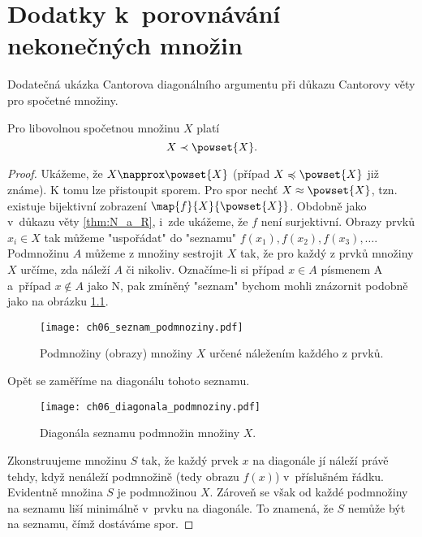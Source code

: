 \chapter{Dodatky k~porovnávání nekonečných množin}\label{chap:dodatky_k_porovnavani_nekonecnych_mn}
Dodatečná ukázka Cantorova diagonálního argumentu při důkazu Cantorovy věty pro spočetné množiny.
\begin{theorem}\label{thm:cantorova_veta_spocetne}
    Pro libovolnou spočetnou množinu $X$ platí
    \begin{equation*}
        X\prec\powset{X}.
    \end{equation*}
\end{theorem}
\begin{proof}
    Ukážeme, že $X\napprox\powset{X}$ (případ $X\preccurlyeq\powset{X}$ již známe). K tomu lze přistoupit sporem. Pro spor nechť $X\approx\powset{X}$, tzn. existuje bijektivní zobrazení $\map{f}{X}{\powset{X}}$. Obdobně jako v~důkazu věty \ref{thm:N_a_R}, i~zde ukážeme, že $f$ není surjektivní. Obrazy prvků $x_i\in X$ tak můžeme "uspořádat" do "seznamu" $f(x_1),f(x_2),f(x_3),\dots$. Podmnožinu $A$ můžeme z množiny sestrojit $X$ tak, že pro každý z prvků množiny $X$ určíme, zda náleží $A$ či nikoliv. Označíme-li si případ $x\in A$ písmenem A a~případ $x\notin A$ jako N, pak zmíněný "seznam" bychom mohli znázornit podobně jako na obrázku \ref{fig:seznam_podmnoziny}.
    \begin{figure}[H]
        \centering
        \texttt{[image: ch06\_seznam\_podmnoziny.pdf]}
        \caption{Podmnožiny (obrazy) množiny $X$ určené náležením každého z prvků.}
        \label{fig:seznam_podmnoziny}
    \end{figure}
    Opět se zaměříme na diagonálu tohoto seznamu.
    \begin{figure}[H]
        \centering
        \texttt{[image: ch06\_diagonala\_podmnoziny.pdf]}
        \caption{Diagonála seznamu podmnožin množiny $X$.}
        \label{fig:diagonala_podmnoziny}
    \end{figure}
    Zkonstruujeme množinu $S$ tak, že každý prvek $x$ na diagonále jí náleží právě tehdy, když nenáleží podmnožině (tedy obrazu $f(x)$) v~příslušném řádku. Evidentně množina $S$ je podmnožinou $X$. Zároveň se však od každé podmnožiny na seznamu liší minimálně v~prvku na diagonále. To znamená, že $S$ nemůže být na seznamu, čímž dostáváme spor.
\end{proof}
